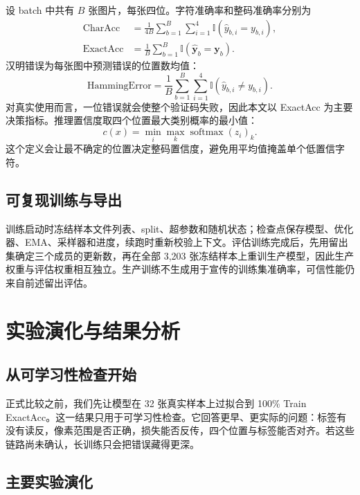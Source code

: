 \documentclass[UTF8,12pt,a4paper]{ctexart}
\begin{document}
设 batch 中共有 $B$ 张图片，每张四位。字符准确率和整码准确率分别为
\begin{align}
  \mathrm{CharAcc}
  &=\frac{1}{4B}\sum_{b=1}^{B}\sum_{i=1}^{4}
    \mathbb{I}(\hat y_{b,i}=y_{b,i}),\\
  \mathrm{ExactAcc}
  &=\frac{1}{B}\sum_{b=1}^{B}
    \mathbb{I}(\hat{\boldsymbol y}_{b}=\boldsymbol y_b).
\end{align}
汉明错误为每张图中预测错误的位置数均值：
\begin{equation}
  \mathrm{HammingError}
  =\frac{1}{B}\sum_{b=1}^{B}\sum_{i=1}^{4}
  \mathbb{I}(\hat y_{b,i}\ne y_{b,i}).
\end{equation}
对真实使用而言，一位错误就会使整个验证码失败，因此本文以 ExactAcc 为主要决策指标。推理置信度取四个位置最大类别概率的最小值：
\begin{equation}
  c(x)=\min_i\max_k\operatorname{softmax}(z_i)_k.
\end{equation}
这个定义会让最不确定的位置决定整码置信度，避免用平均值掩盖单个低置信字符。

\subsection{可复现训练与导出}

训练启动时冻结样本文件列表、split、超参数和随机状态；检查点保存模型、优化器、EMA、采样器和进度，续跑时重新校验上下文。评估训练完成后，先用留出集确定三个成员的更新数，再在全部 3,203 张冻结样本上重训生产模型，因此生产权重与评估权重相互独立。生产训练不生成用于宣传的训练集准确率，可信性能仍来自前述留出评估。

\section{实验演化与结果分析}

\subsection{从可学习性检查开始}

正式比较之前，我们先让模型在 32 张真实样本上过拟合到 100\% Train ExactAcc。这一结果只用于可学习性检查。它回答更早、更实际的问题：标签有没有读反，像素范围是否正确，损失能否反传，四个位置与标签能否对齐。若这些链路尚未确认，长训练只会把错误藏得更深。

\subsection{主要实验演化}
\end{document}
